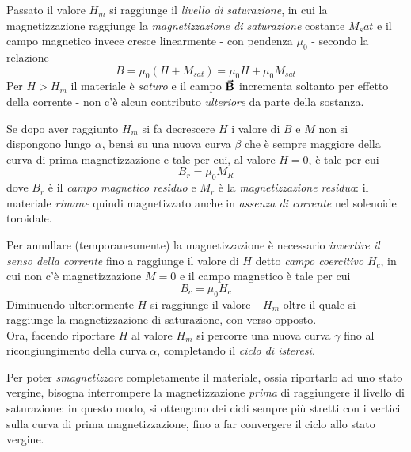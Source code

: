 Passato il valore $H_m$ si raggiunge il \textit{livello di saturazione}, in cui la magnetizzazione raggiunge la \textit{magnetizzazione di saturazione} costante $M_sat$ e il campo magnetico invece cresce linearmente - con pendenza $\mu_0$ - secondo la relazione
\begin{equation*}
	B=\mu_0\left(H+M_{sat}\right)=\mu_0 H+\mu_0M_{sat}
\end{equation*}
Per $H>H_m$ il materiale è \textit{saturo} e il campo $\vb*{\va{B}}$ incrementa soltanto per effetto della corrente - non c'è alcun contributo \textit{ulteriore} da parte della sostanza.

Se dopo aver raggiunto $H_m$ si fa decrescere $H$ i valore di $B$ e $M$ non si dispongono lungo $\alpha$, bensì su una nuova curva $\beta$ che è sempre maggiore della curva di prima magnetizzazione e tale per cui, al valore $H=0$, è tale per cui
\begin{equation*}
	B_r=\mu_0M_R
\end{equation*}
dove $B_r$ è il \textit{campo magnetico residuo} e $M_r$ è la \textit{magnetizzazione residua}: il materiale \textit{rimane} quindi magnetizzato anche in \textit{assenza di corrente} nel solenoide toroidale.

Per annullare (temporaneamente) la magnetizzazione è necessario \textit{invertire il senso della corrente} fino a raggiunge il valore di $H$ detto \textit{campo coercitivo} $H_c$, in cui non c'è magnetizzazione $M=0$ e il campo magnetico è tale per cui
\begin{equation*}
	B_c=\mu_0H_c
\end{equation*}
Diminuendo ulteriormente $H$ si raggiunge il valore $-H_m$ oltre il quale si raggiunge la magnetizzazione di saturazione, con verso opposto.\\
Ora, facendo riportare $H$ al valore $H_m$ si percorre una nuova curva $\gamma$ fino al ricongiungimento della curva $\alpha$, completando il \textit{ciclo di isteresi}.

Per poter \textit{smagnetizzare} completamente il materiale, ossia riportarlo ad uno stato vergine, bisogna interrompere la magnetizzazione \textit{prima} di raggiungere il livello di saturazione: in questo modo, si ottengono dei cicli sempre più stretti con i vertici sulla curva di prima magnetizzazione, fino a far convergere il ciclo allo stato vergine.

